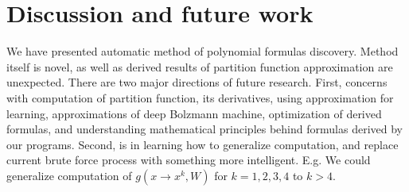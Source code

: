 \documentclass{article}
\begin{document}
\section{Discussion and future work}
We have presented automatic method of polynomial formulas discovery. Method itself is novel, as well 
as derived results of partition function approximation are unexpected.
There are two major directions of future research. First, concerns with computation of partition function,
its derivatives, using approximation for learning, 
approximations of deep Bolzmann machine, optimization of derived formulas, and 
understanding mathematical principles behind formulas derived by our programs. Second, is in 
learning how to generalize computation, and replace current brute force process with something more
intelligent. E.g. We could generalize computation of $g(x \rightarrow x^k, W)$ for $k = 1, 2, 3, 4$ to
$k > 4$. 


\nocite{*}


\end{document}
